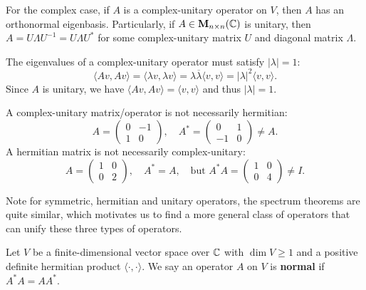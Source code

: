     \begin{theoremenv}
        For the complex case, if $A$ is a complex-unitary operator on $V$, then $A$ has an orthonormal eigenbasis. Particularly, if $A\in \mathbf{M}_{n\times n}(\mathbb{C})$ is unitary, then $A=U\Lambda U^{-1} = U \Lambda U^*$ for some complex-unitary matrix $U$ and diagonal matrix $\Lambda$.
    \end{theoremenv}
    \begin{remarkenv}
        The eigenvalues of a complex-unitary operator must satisfy $|\lambda|=1$:
        $$ \langle A v, A v \rangle = \langle \lambda v, \lambda v \rangle = \lambda \overline{\lambda} \langle v, v \rangle = |\lambda|^2 \langle v, v \rangle. $$
         Since $A$ is unitary, we have $\langle A v, A v \rangle = \langle v, v \rangle$ and thus $|\lambda|=1$.
    \end{remarkenv}
    \begin{remarkenv}
        A complex-unitary matrix/operator is not necessarily hermitian:
        $$ A = \begin{pmatrix}
            0 & -1 \\
            1 & 0
        \end{pmatrix}, \quad A^* = \begin{pmatrix}
            0 & 1 \\
            -1 & 0
        \end{pmatrix} \ne A. $$
        A hermitian matrix is not necessarily complex-unitary:
        $$ A = \begin{pmatrix}
            1 & 0 \\
            0 & 2
        \end{pmatrix}, \quad A^* = A, \quad \text{but } A^* A = \begin{pmatrix}
            1 & 0 \\
            0 & 4
        \end{pmatrix} \ne I. $$
    \end{remarkenv}
    \begin{remarkenv}
        Note for symmetric, hermitian and unitary operators, the spectrum theorems are quite similar, which motivates us to find a more general class of operators that can unify these three types of operators.
    \end{remarkenv}
    \begin{definitionenv}
        Let $V$ be a finite-dimensional vector space over $\mathbb{C}$ with $\dim V\ge 1$ and a positive definite hermitian product $\langle \cdot, \cdot \rangle$. We say an operator $A$ on $V$ is \textbf{normal} if $A^* A = A A^*$.
    \end{definitionenv}
